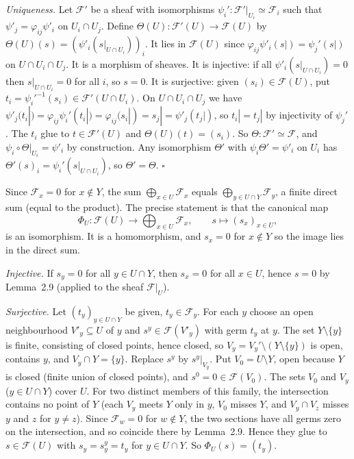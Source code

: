 \documentclass[11pt]{article}
\begin{document}
\emph{Uniqueness.} Let $\mathcal{F}'$ be a sheaf with isomorphisms $\psi_i':\mathcal{F}'|_{U_i}\simeq\mathcal{F}_i$ such that $\psi'_j=\varphi_{ij}\psi'_i$ on $U_i\cap U_j$. Define $\Theta(U):\mathcal{F}'(U)\to\mathcal{F}(U)$ by $\Theta(U)(s)=(\psi'_i(s|_{U\cap U_i}))_i$. It lies in $\mathcal{F}(U)$ since $\varphi_{ij}\psi'_i(s|)=\psi_j'(s|)$ on $U\cap U_i\cap U_j$. It is a morphism of sheaves. It is injective: if all $\psi'_i(s|_{U\cap U_i})=0$ then $s|_{U\cap U_i}=0$ for all $i$, so $s=0$. It is surjective: given $(s_i)\in\mathcal{F}(U)$, put $t_i=\psi_i'^{-1}(s_i)\in\mathcal{F}'(U\cap U_i)$. On $U\cap U_i\cap U_j$ we have $\psi'_j(t_i|)=\varphi_{ij}\psi_i'(t_i|)=\varphi_{ij}(s_i|)=s_j|=\psi'_j(t_j|)$, so $t_i|=t_j|$ by injectivity of $\psi_j'$. The $t_i$ glue to $t\in\mathcal{F}'(U)$ and $\Theta(U)(t)=(s_i)$. So $\Theta:\mathcal{F}'\simeq\mathcal{F}$, and $\psi_i\circ\Theta|_{U_i}=\psi'_i$ by construction. Any isomorphism $\Theta'$ with $\psi_i\Theta'=\psi'_i$ on $U_i$ has $\Theta'(s)_i=\psi_i'(s|_{U\cap U_i})$, so $\Theta'=\Theta$. \hfill$\square$

\pf
Since $\mathcal{F}_x=0$ for $x\notin Y$, the sum $\bigoplus_{x\in U}\mathcal{F}_x$ equals $\bigoplus_{y\in U\cap Y}\mathcal{F}_y$, a finite direct sum (equal to the product). The precise statement is that the canonical map
\[ \Phi_U:\mathcal{F}(U)\to\bigoplus_{x\in U}\mathcal{F}_x,\qquad s\mapsto(s_x)_{x\in U}, \]
is an isomorphism. It is a homomorphism, and $s_x=0$ for $x\notin Y$ so the image lies in the direct sum.

\emph{Injective.} If $s_y=0$ for all $y\in U\cap Y$, then $s_x=0$ for all $x\in U$, hence $s=0$ by Lemma~2.9 (applied to the sheaf $\mathcal{F}|_U$).

\emph{Surjective.} Let $(t_y)_{y\in U\cap Y}$ be given, $t_y\in\mathcal{F}_y$. For each $y$ choose an open neighbourhood $V'_y\subseteq U$ of $y$ and $s^y\in\mathcal{F}(V'_y)$ with germ $t_y$ at $y$. The set $Y\setminus\{y\}$ is finite, consisting of closed points, hence closed, so $V_y=V_y'\setminus(Y\setminus\{y\})$ is open, contains $y$, and $V_y\cap Y=\{y\}$. Replace $s^y$ by $s^y|_{V_y}$. Put $V_0=U\setminus Y$, open because $Y$ is closed (finite union of closed points), and $s^0=0\in\mathcal{F}(V_0)$. The sets $V_0$ and $V_y$ ($y\in U\cap Y$) cover $U$. For two distinct members of this family, the intersection contains no point of $Y$ (each $V_y$ meets $Y$ only in $y$, $V_0$ misses $Y$, and $V_y\cap V_z$ misses $y$ and $z$ for $y\neq z$). Since $\mathcal{F}_w=0$ for $w\notin Y$, the two sections have all germs zero on the intersection, and so coincide there by Lemma~2.9. Hence they glue to $s\in\mathcal{F}(U)$ with $s_y=s^y_y=t_y$ for $y\in U\cap Y$. So $\Phi_U(s)=(t_y)$.
\end{document}
